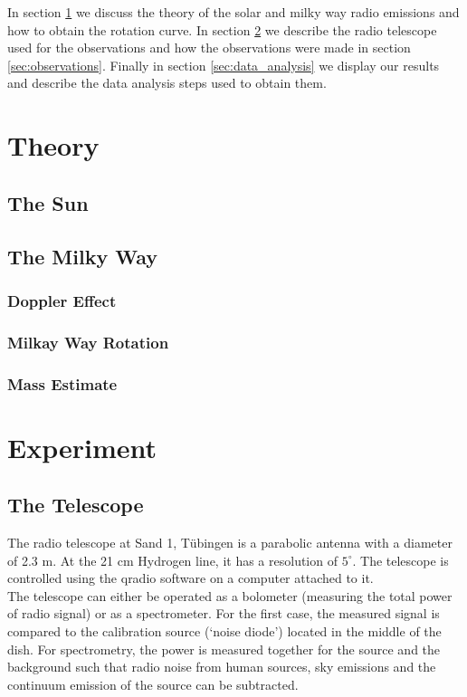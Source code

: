 \documentclass[12pt,a4paper]{article}
\begin{document}
    In section \ref{sec:theory} we discuss the theory of the solar and milky way radio emissions and how to obtain the rotation curve. In section \ref{sec:experiment} we describe the 
    radio telescope used for the observations and how the observations were made in section \ref{sec:observations}. Finally in section \ref{sec:data_analysis} we display our results and describe the data analysis steps used to obtain them. 

\section{Theory}
\label{sec:theory}
  \subsection{The Sun}
  \subsection{The Milky Way}
    \subsubsection{Doppler Effect}
    \subsubsection{Milkay Way Rotation}
    \subsubsection{Mass Estimate}

\section{Experiment}
\label{sec:experiment}
    \subsection{The Telescope}
        The radio telescope at Sand 1, Tübingen is a parabolic antenna with a diameter of 2.3 m. At the 21 cm Hydrogen line, it has a
        resolution of $5^\circ$. The telescope is controlled using the qradio software on a computer attached to it. \\
        The telescope can either be operated as a bolometer (measuring the total power of radio signal) or as a spectrometer. For the first case,
        the measured signal is compared to the calibration source (`noise diode') located in the middle of the dish. For spectrometry, the power is measured 
        together for the source and the background such that radio noise from human sources, sky emissions and the continuum emission of the source can be subtracted.
\end{document}
